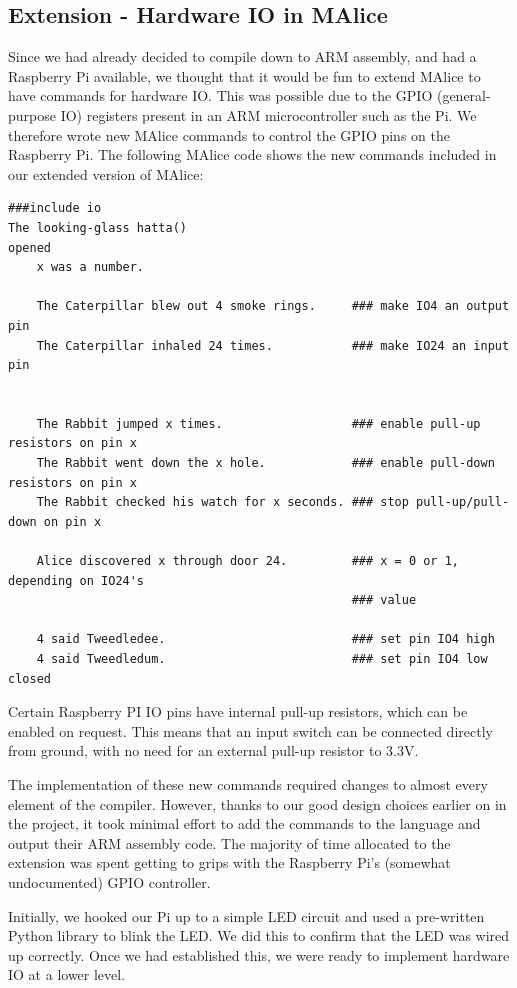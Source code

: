 \documentclass[11pt, notitlepage]{report}
\begin{document}
\subsection*{Extension - Hardware IO in MAlice}
Since we had already decided to compile down to ARM assembly, and had a Raspberry Pi available, we thought that it would be fun to extend MAlice to have commands for hardware IO. This was possible due to the GPIO (general-purpose IO) registers present in an ARM microcontroller such as the Pi. We therefore wrote new MAlice commands to control the GPIO pins on the Raspberry Pi. The following MAlice code shows the new commands included in our extended version of MAlice:

\begin{verbatim}
###include io
The looking-glass hatta()
opened
    x was a number.

    The Caterpillar blew out 4 smoke rings.     ### make IO4 an output pin
    The Caterpillar inhaled 24 times.           ### make IO24 an input pin


    The Rabbit jumped x times.                  ### enable pull-up resistors on pin x 
    The Rabbit went down the x hole.            ### enable pull-down resistors on pin x 
    The Rabbit checked his watch for x seconds. ### stop pull-up/pull-down on pin x

    Alice discovered x through door 24.         ### x = 0 or 1, depending on IO24's 
                                                ### value

    4 said Tweedledee.                          ### set pin IO4 high
    4 said Tweedledum.                          ### set pin IO4 low
closed
\end{verbatim}

Certain Raspberry PI IO pins have internal pull-up resistors, which can be enabled on request. This means that an input switch can be connected directly from ground, with no need for an external pull-up resistor to 3.3V.

The implementation of these new commands required changes to almost every element of the compiler. However, thanks to our good design choices earlier on in the project, it took minimal effort to add the commands to the language and output their ARM assembly code. The majority of time allocated to the extension was spent getting to grips with the Raspberry Pi's (somewhat undocumented) GPIO controller.

Initially, we hooked our Pi up to a simple LED circuit and used a pre-written Python library to blink the LED. We did this to confirm that the LED was wired up correctly. Once we had established this, we were ready to implement hardware IO at a lower level.
\end{document}
